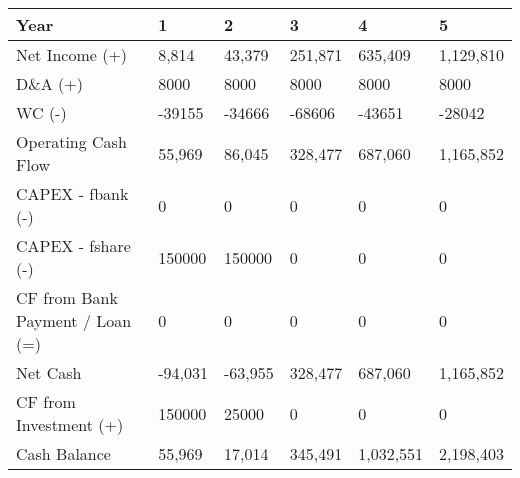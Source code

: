\begin{tabular}{llllll}
\hline
 Year                            & 1       & 2       & 3       & 4         & 5         \\
\hline
 Net Income (+)                  & 8,814   & 43,379  & 251,871 & 635,409   & 1,129,810 \\
 D\&A (+)                         & 8000    & 8000    & 8000    & 8000      & 8000      \\
 WC (-)                          & -39155  & -34666  & -68606  & -43651    & -28042    \\
 Operating Cash Flow             & 55,969  & 86,045  & 328,477 & 687,060   & 1,165,852 \\
 CAPEX - fbank (-)               & 0       & 0       & 0       & 0         & 0         \\
 CAPEX - fshare (-)              & 150000  & 150000  & 0       & 0         & 0         \\
 CF from Bank Payment / Loan (=) & 0       & 0       & 0       & 0         & 0         \\
 Net Cash                        & -94,031 & -63,955 & 328,477 & 687,060   & 1,165,852 \\
 CF from Investment (+)          & 150000  & 25000   & 0       & 0         & 0         \\
 Cash Balance                    & 55,969  & 17,014  & 345,491 & 1,032,551 & 2,198,403 \\
\hline
\end{tabular}